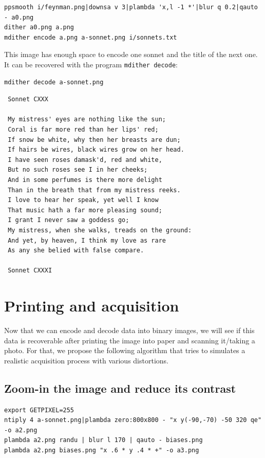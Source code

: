 \begin{verbatim}
ppsmooth i/feynman.png|downsa v 3|plambda 'x,l -1 *'|blur q 0.2|qauto - a0.png
dither a0.png a.png
mdither encode a.png a-sonnet.png i/sonnets.txt
\end{verbatim}

This image has enough space to encode one sonnet and the title of
the next one.  It can be
recovered with the program \verb+mdither decode+:

 \begin{verbatim}
mdither decode a-sonnet.png
\end{verbatim} %

 \begin{verbatim}
 Sonnet CXXX

 My mistress' eyes are nothing like the sun;
 Coral is far more red than her lips' red;
 If snow be white, why then her breasts are dun;
 If hairs be wires, black wires grow on her head.
 I have seen roses damask'd, red and white,
 But no such roses see I in her cheeks;
 And in some perfumes is there more delight
 Than in the breath that from my mistress reeks.
 I love to hear her speak, yet well I know
 That music hath a far more pleasing sound;
 I grant I never saw a goddess go;
 My mistress, when she walks, treads on the ground:
 And yet, by heaven, I think my love as rare
 As any she belied with false compare.

 Sonnet CXXXI

\end{verbatim} %


\section{Printing and acquisition}

Now that we can encode and decode data into binary images, we will see if
this data is recoverable after printing the image into paper and scanning
it/taking a photo.  For that, we propose the following algorithm that tries
to simulates a realistic acquisition process with various distortions.

\clearpage
\subsection{Zoom-in the image and reduce its contrast}

\begin{verbatim}
export GETPIXEL=255
ntiply 4 a-sonnet.png|plambda zero:800x800 - "x y(-90,-70) -50 320 qe" -o a2.png
plambda a2.png randu | blur l 170 | qauto - biases.png
plambda a2.png biases.png "x .6 * y .4 * +" -o a3.png
\end{verbatim}
\begin{gallery}
\end{gallery}

